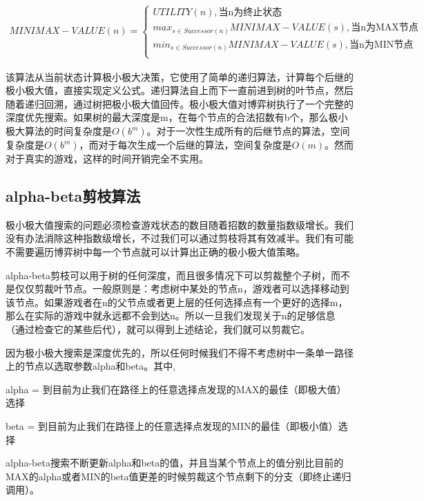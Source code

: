 \documentclass[c5size]{ctexart}
\begin{document}
	\begin{align}
		MINIMAX-VALUE(n) = 
		\begin{cases}
		UTILITY(n),\text{当n为终止状态}\\
		max_{s \in Successor(n)}MINIMAX-VALUE(s),\text{当n为MAX节点}\\
		min_{ s \in Successor(n)} MINIMAX-VALUE(s),\text{当n为MIN节点} \\
		\end{cases}
	\end{align}
	
	该算法从当前状态计算极小极大决策，它使用了简单的递归算法，计算每个后继的极小极大值，直接实现定义公式。递归算法自上而下一直前进到树的叶节点，然后随着递归回溯，通过树把极小极大值回传。极小极大值对博弈树执行了一个完整的深度优先搜索。如果树的最大深度是m，在每个节点的合法招数有b个，那么极小极大算法的时间复杂度是$O(b^m)$。对于一次性生成所有的后继节点的算法，空间复杂度是$O(b^m)$，而对于每次生成一个后继的算法，空间复杂度是$O(m)$。然而对于真实的游戏，这样的时间开销完全不实用。
	
\subsection{alpha-beta剪枝算法}
	极小极大值搜索的问题必须检查游戏状态的数目随着招数的数量指数级增长。我们没有办法消除这种指数级增长，不过我们可以通过剪枝将其有效减半。我们有可能不需要遍历博弈树中每一个节点就可以计算出正确的极小极大值策略。\par
	
	alpha-beta剪枝可以用于树的任何深度，而且很多情况下可以剪裁整个子树，而不是仅仅剪裁叶节点。一般原则是：考虑树中某处的节点n，游戏者可以选择移动到该节点。如果游戏者在n的父节点或者更上层的任何选择点有一个更好的选择m，那么在实际的游戏中就永远都不会到达n。所以一旦我们发现关于n的足够信息（通过检查它的某些后代），就可以得到上述结论，我们就可以剪裁它。\par
	
	因为极小极大搜索是深度优先的，所以任何时候我们不得不考虑树中一条单一路径上的节点以选取参数alpha和beta。其中,\par
	alpha = 到目前为止我们在路径上的任意选择点发现的MAX的最佳（即极大值）选择\par
	beta = 到目前为止我们在路径上的任意选择点发现的MIN的最佳（即极小值）选择\par
	alpha-beta搜索不断更新alpha和beta的值，并且当某个节点上的值分别比目前的MAX的alpha或者MIN的beta值更差的时候剪裁这个节点剩下的分支（即终止递归调用）。\par
	
\end{document}
